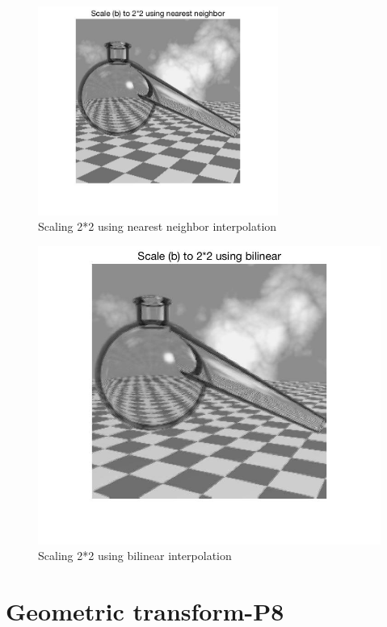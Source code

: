 \documentclass[11pt,oneside]{book}
\begin{document}
\begin{figure}[!htb]
   \centering  
   \includegraphics[width=0.7\textwidth]{images/6/scale_nn.jpg}
   \caption{Scaling 2*2 using nearest neighbor interpolation}
\end{figure}
\begin{figure}[!htb]
   \centering  
   \includegraphics[width=1\textwidth]{images/6/scale_b.jpg}
   \caption{Scaling 2*2 using bilinear interpolation}
\end{figure}

\newpage

\chapter{Geometric transform-P8}
\end{document}
